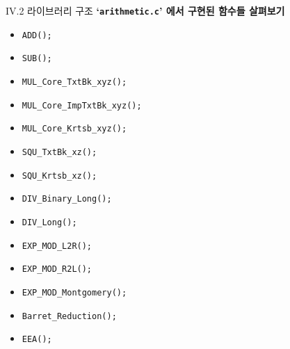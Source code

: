\documentclass{beamer}
\begin{document}
\begin{frame}{IV.2 라이브러리 구조}
	\alert{\bf `\texttt{arithmetic.c}' 에서 구현된 함수들 살펴보기}\\
	\begin{itemize}
		\item \texttt{ADD();}
		\item \texttt{SUB();}
		\item \texttt{MUL\_Core\_TxtBk\_xyz();}
		\item \texttt{MUL\_Core\_ImpTxtBk\_xyz();}
		\item \texttt{MUL\_Core\_Krtsb\_xyz();}
		\item \texttt{SQU\_TxtBk\_xz();}
		\item \texttt{SQU\_Krtsb\_xz();}
		\item \texttt{DIV\_Binary\_Long();}
		\item {\texttt{DIV\_Long();}}
		\item \texttt{EXP\_MOD\_L2R();}
		\item \texttt{EXP\_MOD\_R2L();}
		\item \texttt{EXP\_MOD\_Montgomery();}
		\item {\texttt{Barret\_Reduction();}}
		\item \texttt{EEA();}
	\end{itemize}
\end{frame}
\end{document}
